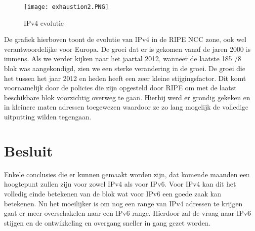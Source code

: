 \begin{figure}
\centering
\texttt{[image: exhaustion2.PNG]}
\caption{IPv4 evolutie \autocite{RIR2018}}
\end{figure}

De grafiek hierboven toont de evolutie van IPv4 in de RIPE NCC zone, ook wel verantwoordelijke voor Europa. De groei dat er is gekomen vanaf de jaren 2000 is immens. Als we verder kijken naar het jaartal 2012, wanneer de laatste 185 /8 blok was aangekondigd, zien we een sterke verandering in de groei. De groei die het tussen het jaar 2012 en heden heeft een zeer kleine stijgingsfactor. Dit komt voornamelijk door de policies die zijn opgesteld door RIPE om met de laatst beschikbare blok voorzichtig overweg te gaan. Hierbij werd er grondig gekeken en in kleinere maten adressen toegewezen waardoor ze zo lang mogelijk de volledige uitputting wilden tegengaan.

\section{Besluit}

Enkele conclusies die er kunnen gemaakt worden zijn, dat komende maanden een hoogtepunt zullen zijn voor zowel IPv4 als voor IPv6. Voor IPv4 kan dit het volledig einde betekenen van de blok wat voor IPv6 een goede zaak kan betekenen. Nu het moeilijker is om nog een range van IPv4 adressen te krijgen gaat er meer overschakelen naar een IPv6 range. Hierdoor zal de vraag naar IPv6 stijgen en de ontwikkeling en overgang sneller in gang gezet worden.  